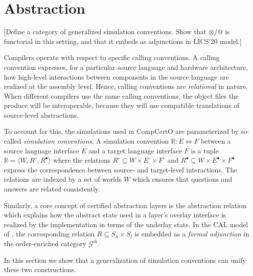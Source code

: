 \documentclass[sigplan,10pt,review,anonymous]{acmart}
\newcommand{\que}{{\circ}}
\newcommand{\ans}{{\bullet}}
\begin{document}

\section{Abstraction} %

[Define a category of generalized simulation conventions.
Show that $\otimes$/$@$ is functorial in this setting,
and that it embeds as adjunctions in LICS'20 model.]

Compilers operate with respect to specific calling conventions.
A calling convention expresses,
for a particular source language and hardware architecture,
how high-level interactions between components in the source language
are realized at the assembly level.
Hence, calling conventions are \emph{relational} in nature.
When different compilers use the same calling conventions,
the object files the produce will be interoperable,
because they will use compatible translations
of source-level abstractions.

To account for this,
the simulations used in CompCertO
are parameterized by so-called \emph{simulation conventions}.
A simulation convention $\mathbb{R} : E \Leftrightarrow F$
between a source language interface $E$
and a target language interface $F$
is a tuple $\mathbb{R} = \langle W, R^\que, R^\ans \rangle$
where the relations $R^\que \subseteq W \times E^\que \times F^\que$
and $R^\ans \subseteq W \times E^\ans \times F^\ans$
express the correspondence between
source- and target-level interactions.
The relations are indexed by a set of worlds $W$
which ensures that questions and answers are related consistently.

Similarly,
a core concept of certified abstraction layers
is the abstraction relation
which explains how the abstract state
used in a layer's overlay interface
is realized by the implementation
in terms of the underlay state.
In the CAL model of \citep{lics20},
the corresponding relation $R \subseteq S_h \times S_l$
is embedded as a \emph{formal adjunction}
in the order-enriched category $\mathcal{G}^{ib}$.

In this section we show that a generalization of
simulation conventions can unify these two constructions.
\end{document}
